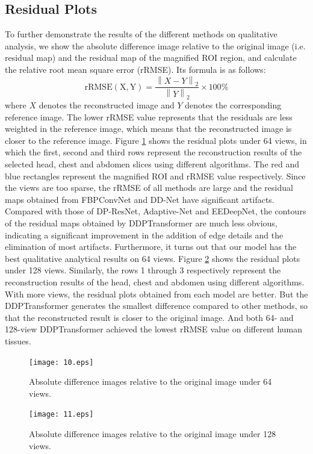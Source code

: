 \documentclass[lettersize,journal]{IEEEtran}
\begin{document}
\subsection{Residual Plots}

To further demonstrate the results of the different methods on qualitative analysis, we show the absolute difference image relative to the original image (i.e. residual map) and the residual map of the magnified ROI region, and calculate the relative root mean square error (rRMSE). Its formula is as follows:
\begin{equation}
\mathrm{rRMSE(X,Y)} = \frac{\left\|X-Y\right\|_2}{\left\|Y\right\|_2} \times 100\%   
\end{equation}
where $X$ denotes the reconstructed image and $Y$ denotes the corresponding reference image. The lower rRMSE value represents that the residuals are less weighted in the reference image, which means that the reconstructed image is closer to the reference image. Figure \ref{fig10} shows the residual plots under 64 views, in which the first, second and third rows represent the reconstruction results of the selected head, chest and abdomen slices using different algorithms. The red and blue rectangles represent the magnified ROI and rRMSE value respectively. Since the views are too sparse, the rRMSE of all methods are large and the residual maps obtained from FBPConvNet and DD-Net have significant artifacts. Compared with those of  DP-ResNet, Adaptive-Net and EEDeepNet, the contours of the residual maps obtained by DDPTransformer are much less obvious, indicating a significant improvement in the addition of edge details and the elimination of most artifacts. Furthermore, it turns out that our model has the best qualitative analytical results on 64 views. Figure \ref{fig11} shows the residual plots under 128 views. Similarly, the rows 1 through 3 respectively represent the reconstruction results of the head, chest and abdomen using different algorithms. With more views, the residual plots obtained from each model are better. But the DDPTransformer generates the smallest difference compared to other methods, so that the reconstructed result is closer to the original image. And both 64- and 128-view DDPTransformer achieved the lowest rRMSE value on different human tissues.
\begin{figure}[!t]
	\centering
	\texttt{[image: 10.eps]}
	\caption{Absolute difference images relative to the original image under 64 views.}
	\label{fig10}
\end{figure}
\begin{figure}[!t]
	\centering
	\texttt{[image: 11.eps]}
	\caption{Absolute difference images relative to the original image under 128 views.}
	\label{fig11}
\end{figure}
\end{document}
